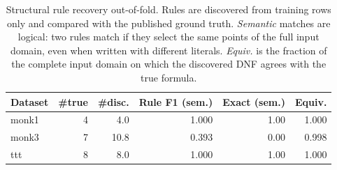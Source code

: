 \begin{table}[t]\centering
\small
\caption{Structural rule recovery out-of-fold. Rules are discovered from training rows only and compared with the published ground truth. \emph{Semantic} matches are logical: two rules match if they select the same points of the full input domain, even when written with different literals. \emph{Equiv.} is the fraction of the complete input domain on which the discovered DNF agrees with the true formula.}
\label{tab:nested-structural}
\begin{tabular}{lrrrrr}
\toprule
Dataset & \#true & \#disc. & Rule F1 (sem.) & Exact (sem.) & Equiv. \\
\midrule
monk1 & 4 & 4.0 & 1.000 & 1.00 & 1.000 \\
monk3 & 7 & 10.8 & 0.393 & 0.00 & 0.998 \\
ttt & 8 & 8.0 & 1.000 & 1.00 & 1.000 \\
\bottomrule
\end{tabular}
\end{table}
